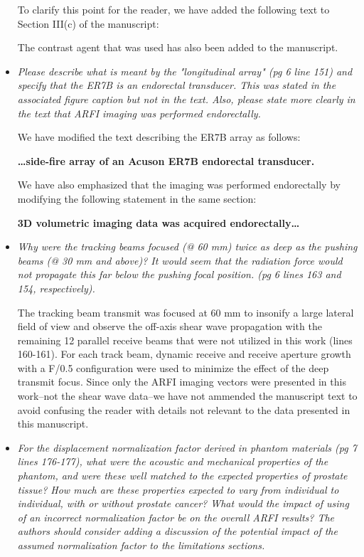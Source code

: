 \documentclass[10pt]{article}
\begin{document}
\begin{itemize}
    To clarify this point for the reader, we have added the following text to
    Section III(c) of the manuscript:

    \textbf{}

    The contrast agent that was used has also been added to the manuscript.

    \item \textit{Please describe what is meant by the "longitudinal array" (pg
            6 line 151) and specify that the ER7B is an endorectal transducer.
            This was stated in the associated figure caption but not in the
            text.  Also, please state more clearly in the text that ARFI
            imaging was performed endorectally.}

    We have modified the text describing the ER7B array as follows:

    \textbf{\ldots side-fire array of an Acuson ER7B endorectal transducer.}

    We have also emphasized that the imaging was performed endorectally by
    modifying the following statement in the same section:

    \textbf{3D volumetric imaging data was acquired endorectally\ldots}

    \item \textit{Why were the tracking beams focused (@ 60 mm) twice as deep
            as the pushing beams (@ 30 mm and above)?  It would seem that the
            radiation force would not propagate this far below the pushing
            focal position. (pg 6 lines 163 and 154, respectively).}

    The tracking beam transmit was focused at 60 mm to insonify a large lateral
    field of view and observe the off-axis shear wave propagation with the
    remaining 12 parallel receive beams that were not utilized in this work
    (lines 160-161). For each track beam, dynamic receive and receive aperture
    growth with a F/0.5 configuration were used to minimize the effect of the
    deep transmit focus.  Since only the ARFI imaging vectors were presented in
    this work--not the shear wave data--we have not ammended the manuscript
    text to avoid confusing the reader with details not relevant to the data
    presented in this manuscript.


    \item \textit{For the displacement normalization factor derived in phantom
            materials (pg 7 lines 176-177), what were the acoustic and
            mechanical properties of the phantom, and were these well matched
            to the expected properties of prostate tissue?  How much are these
            properties expected to vary from individual to individual, with or
            without prostate cancer?  What would the impact of using of an
            incorrect normalization factor be on the overall ARFI results?  The
            authors should consider adding a discussion of the potential impact
            of the assumed normalization factor to the limitations sections.}


\end{itemize}
\end{document}
